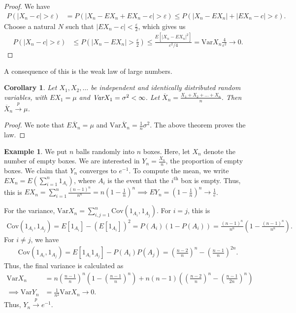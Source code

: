 \documentclass[15pt,a4paper]{book}
\newtheorem{corollary}[theorem]{Corollary}
\theoremstyle{definition}
\newtheorem{example}[theorem]{Example}
\newcommand{\abs}[1]{\left| #1 \right|} %
\newcommand{\Var}{\text{Var}}
\newcommand{\toup}[1]{\xrightarrow{#1}}
\begin{document}
\begin{proof}
    We have
    \begin{align}
        P(\abs{X_{n}-c} > \varepsilon) &= P(\abs{X_{n}-EX_{n}+EX_{n}-c} > \varepsilon) \leq P(\abs{X_{n}-EX_{n}} + \abs{EX_{n}-c} > \varepsilon).
    \end{align}
    Choose a natural $N$ such that $\abs{EX_{n}-c} < \frac{\varepsilon}{2}$, which gives us
    \begin{align}
        P(\abs{X_{n}-c} > \varepsilon) &\leq P(\abs{X_{n}-EX_{n}} > \frac{\varepsilon}{2}) \leq \frac{E[\abs{X_{n}-EX_{n}}^{2}]}{\varepsilon^{2}/4} = \Var X_{n} \frac{4}{\varepsilon^{2}} \to 0.
    \end{align}
\end{proof}
A consequence of this is the weak law of large numbers.
\begin{corollary}
    Let $X_{1},X_{2},\ldots$ be independent and identically distributed random variables, with $EX_{1} = \mu$ and $\emph{\text{Var}}X_{1} = \sigma^{2} < \infty$. Let $\overline{X}_{n} = \frac{X_{1}+X_{2}+\ldots+X_{n}}{n}$. Then $\overline{X}_{n} \toup{p} \mu$.
\end{corollary}
\begin{proof}
    We note that $E\overline{X}_{n} = \mu$ and $\Var \overline{X}_{n} = \frac{1}{n} \sigma^{2}$. The above theorem proves the law.
\end{proof}

\begin{example}
    We put $n$ balls randomly into $n$ boxes. Here, let $X_{n}$ denote the number of empty boxes. We are interested in $Y_{n} = \frac{X_{n}}{n}$, the proportion of empty boxes. We claim that $Y_{n}$ converges to $e^{-1}$. To compute the mean, we write $EX_{n} = E(\sum_{i=1}^{n} 1_{A_{i}})$, where $A_{i}$ is the event that the $i^{\text{th}}$ box is empty. Thus, this is $EX_{n} = \sum_{i=1}^{n} \frac{(n-1)^{n}}{n^{n}} = n(1-\frac{1}{n})^{n} \implies EY_{n} = (1-\frac{1}{n})^{n} \to \frac{1}{e}$.

    For the variance, $\Var X_{n} = \sum_{i,j=1}^{n} \text{Cov} (1_{A_{i}},1_{A_{j}})$. For $i = j$, this is
    \begin{align}
        \text{Cov}(1_{A_{i}},1_{A_{j}}) = E[1_{A_{i}}] - (E[1_{A_{i}}])^{2} = P(A_{i})(1-P(A_{i})) = \frac{(n-1)^{n}}{n^{n}}\left( 1- \frac{(n-1)^{n}}{n^{n}} \right).
    \end{align}
    For $i \neq j$, we have
    \begin{align}
        \text{Cov}(1_{A_{i}},1_{A_{j}}) = E[1_{A_{i}}1_{A_{j}}] - P(A_{i})P(A_{j}) = \left( \frac{n-2}{n} \right)^{n} - \left( \frac{n-1}{n} \right)^{2n}.
    \end{align}
    Thus, the final variance is calculated as
    \begin{align}
        \Var X_{n} &= n \left( \frac{n-1}{n} \right)^{n} \left( 1- \left( \frac{n-1}{n} \right)^{n} \right) + n(n-1) \left( \left( \frac{n-2}{n} \right)^{n} - \left( \frac{n-1}{2n} \right)^{n} \right) \\
        \implies \Var Y_{n} &= \frac{1}{n^{2}} \Var X_{n} \to 0.
    \end{align}
    Thus, $Y_{n} \toup{p} e^{-1}$.
\end{example}
\end{document}
